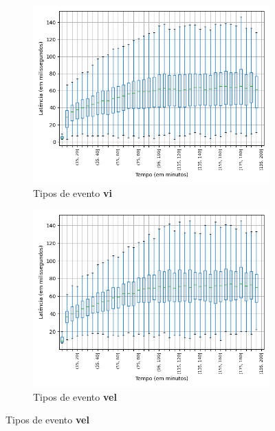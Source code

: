 \begin{figure}
\begin{subfigure}{.5\textwidth}
\centering
\includegraphics[width=\textwidth]{figuras/graphics/boxplot_8-dez-is_vi.png}
\caption{Tipos de evento \textbf{vi}}
\label{fig:BoxPlot_vi_IS_8-dez-is}
\end{subfigure}%
\centering
\begin{subfigure}{.5\textwidth}
\centering
\includegraphics[width=\textwidth]{figuras/graphics/boxplot_8-dez-is_vel.png}
\caption{Tipos de evento \textbf{vel}}
\label{fig:BoxPlot_vel_IS_8-dez-is}
\end{subfigure}%


\end{figure}
